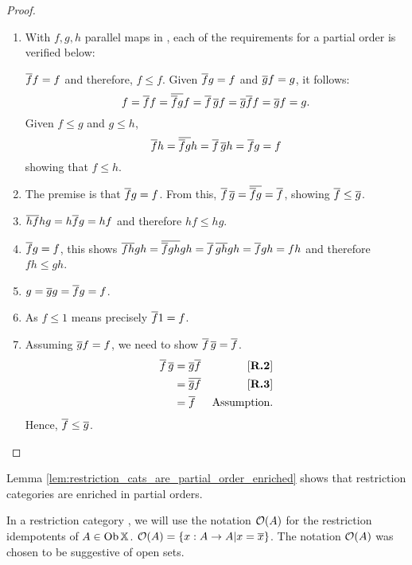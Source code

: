 \begin{proof}
  \prepprooflist
  \begin{enumerate}[{(}i{)}]
    \item With $f,g,h$ parallel maps in \X, each of the requirements for a partial order is
    verified below:
    \begin{description}
       $\overline{f} f = f$ and therefore, $ f \le f$.
       Given $\overline{f}g = f$ and $\overline{g}f = g$, it follows:
        \[
          f = \overline{f} f = \overline{\overline{f} g} f = \overline{f}\, \overline{g} f
          = \overline{g}\overline{f} f =  \overline{g} f = g.
        \]
       Given $f \le g$ and $g\le h$,
        \[
          \overline{f} h = \overline{\overline{f} g} h = \overline{f}\, \overline{g} h = \overline{f} g = f
        \]
        showing that $f \le h$.
    \end{description}
    \item The premise is that $\overline{f} g = f$. From this, $ \overline{f}\, \overline{g} =
      \overline{\overline{f} g} = \overline{f}$, showing $\overline{f} \le \overline{g}$.
    \item $\overline{h f} h g = h \overline{f} g = h f$  and therefore $h f \le h g$.
    \item $\overline{f} g = f$, this shows $\overline{f h} g h = \overline{\overline{f} g h} g h
      = \overline{f}\, \overline{g h} g h = \overline{f} g h = f h$ and therefore $f h \le g h$.
    \item $g = \overline{g} g = \overline{f} g = f$.
    \item As $f \le 1$ means precisely $\overline{f}1 = f$.
    \item Assuming $\overline{g} f = f$, we need to show $\overline{f}\, \overline{g} = \overline{f}$.
      \begin{align*}
        \overline{f}\,\overline{g} &= \overline{g}\overline{f} & [\text{\bfseries {R}.{2}}] \\
        & = \overline{\overline{g} f} & [\text{\bfseries {R}.{3}}] \\
        & = \overline{f} & \text{Assumption}.
      \end{align*}
      Hence, $\overline{f} \le \overline{g}$.
  \end{enumerate}
\end{proof}

Lemma \ref{lem:restriction_cats_are_partial_order_enriched} shows that restriction
categories are enriched in partial orders.

In a restriction category \X, we will use the notation $\mathcal{O}({A})$ for the restriction idempotents
of $A\in \operatorname{Ob}{\mathbb{X}}$. $\mathcal{O}({A}) = \{x:A\to A| x = \overline{x}\}$. The notation $\mathcal{O}({A})$ was chosen
to be suggestive of open sets.

